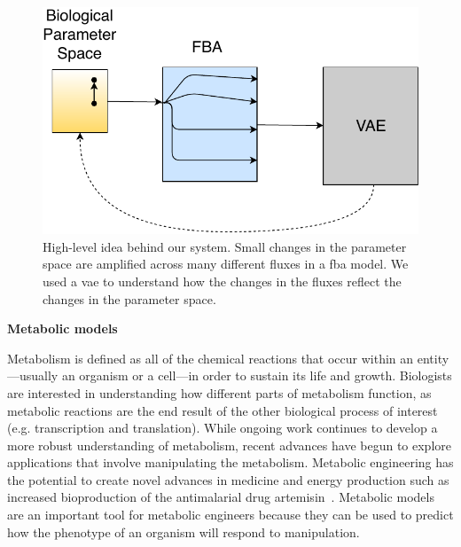 \begin{figure}[t!]
\begin{center}
\includegraphics[width=\textwidth]{figs/FBA_Amplifier.pdf}
\end{center}
\caption[High-level idea behind our system]{High-level idea behind our system.
Small changes in the parameter space are amplified across many different fluxes in a \gls{fba} model.
We used a \gls{vae} to understand how the changes in the fluxes reflect the changes in the parameter space. 
}
\label{fig:fba_amp}
\end{figure}

\textbf{Metabolic models}

Metabolism is defined as all of the chemical reactions that occur within an entity---usually an organism or a cell---in order to sustain its life and growth.
Biologists are interested in understanding how different parts of metabolism function, as metabolic reactions are the end result of the other biological process of interest (e.g. transcription and translation).
While ongoing work continues to develop a more robust understanding of metabolism, recent advances have begun to explore applications that involve manipulating the metabolism. 
Metabolic engineering has the potential to create novel advances in medicine and energy production such as increased bioproduction of the antimalarial drug artemisin~\cite{keasling2012synthetic}.
Metabolic models are an important tool for metabolic engineers because they can be used to predict how the phenotype of an organism will respond to manipulation.

